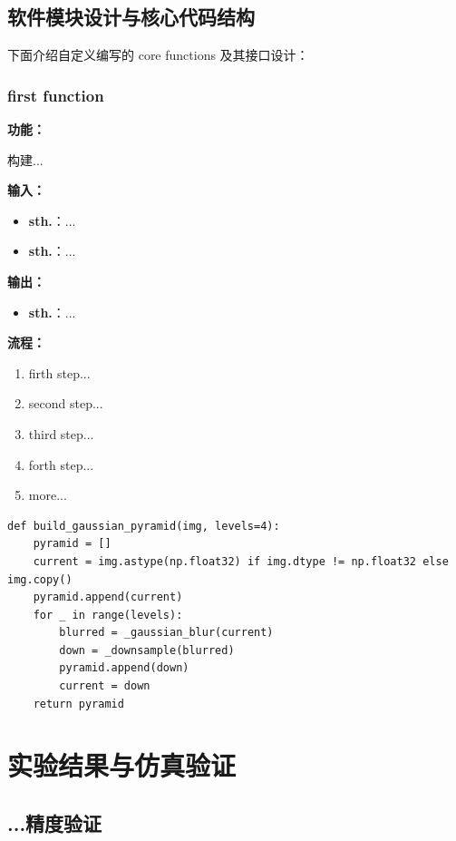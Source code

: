 \documentclass[11pt, a4paper]{article}
\begin{document}
\subsection{软件模块设计与核心代码结构}
下面介绍自定义编写的 core functions 及其接口设计：
\subsubsection{first function}

\textbf{功能：}

构建...

\textbf{输入：}
\begin{itemize}
    \item \textbf{sth.}：...
    \item \textbf{sth.}：...
\end{itemize}

\textbf{输出：}
\begin{itemize}
    \item \textbf{sth.}：...
\end{itemize}

\textbf{流程：}
\begin{enumerate}
    \item firth step...
    \item second step...
    \item third step...
    \item forth step...
    \item more...
\end{enumerate}

\begin{lstlisting}   
def build_gaussian_pyramid(img, levels=4):
    pyramid = []
    current = img.astype(np.float32) if img.dtype != np.float32 else img.copy()
    pyramid.append(current)
    for _ in range(levels):
        blurred = _gaussian_blur(current)
        down = _downsample(blurred)
        pyramid.append(down)
        current = down
    return pyramid
\end{lstlisting}


\section{实验结果与仿真验证}
\subsection{...精度验证}
\end{document}
